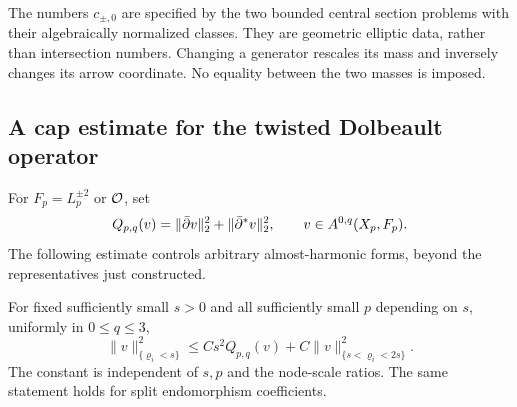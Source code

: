 The numbers $c_{\pm,0}$ are specified by the two bounded
central section problems with their algebraically normalized
classes. They are geometric elliptic data, rather than
intersection numbers. Changing a generator rescales its
mass and inversely changes its arrow coordinate. No equality
between the two masses is imposed.

\subsection{A cap estimate for the twisted Dolbeault operator}

For $F_p=L_p^{\pm2}$ or $\mathcal O$, set
\[
 Q_{p,q}(v)=\|\bar\partial v\|_2^2+\|\bar\partial^*v\|_2^2,
                      \qquad v\in A^{0,q}(X_p,F_p).
\]
The following estimate controls arbitrary almost-harmonic
forms, beyond the representatives just constructed.

\begin{lemma}\label{lem:dolbeault-cap}
For fixed sufficiently small $s>0$ and all sufficiently
small $p$ depending on $s$, uniformly in $0\le q\le3$,
\begin{equation}\label{eq:dolbeault-cap}
 \|v\|^2_{\{\varrho_i<s\}}
 \le Cs^2Q_{p,q}(v)+C\|v\|^2_{\{s<\varrho_i<2s\}}.
\end{equation}
The constant is independent of $s,p$ and the node-scale
ratios. The same statement holds for split endomorphism
coefficients.
\end{lemma}

